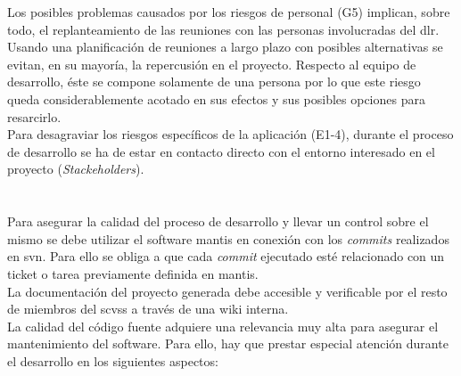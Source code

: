 Los posibles problemas causados por los riesgos de personal (G5) implican, sobre todo, el replanteamiento de las reuniones con las personas involucradas del \gls{dlr}. Usando una planificación de reuniones a largo plazo con posibles alternativas se evitan, en su mayoría, la repercusión en el proyecto. Respecto al equipo de desarrollo, éste se compone solamente de una persona por lo que este riesgo queda considerablemente acotado en sus efectos y sus posibles opciones para resarcirlo.\\

Para desagraviar los riesgos específicos de la aplicación (E1-4), durante el proceso de desarrollo se ha de estar en contacto directo con el entorno interesado en el proyecto (\textit{Stackeholders}).

\section{}

\begin{comment}
En esta sección se incluirán las actividades y tareas relacionadas con el aseguramiento de calidad a realizar durante el desarrollo del software. Se incluirán los estándares, prácticas y normas aplicables durante el desarrollo del software.\\

También, deberán recogerse los diferentes tipos de revisiones, verificaciones y validaciones que se van a llevar a cabo, los criterios para la aceptación o rechazo de cada producto y los procedimientos para implementar acciones correctoras o preventivas.
\end{comment}
Para asegurar la calidad del proceso de desarrollo y llevar un control sobre el mismo se debe utilizar el \gls{software} \gls{mantis} en conexión con los \textit{commits} realizados en \gls{svn}. Para ello se obliga a que cada \textit{commit} ejecutado esté relacionado con un ticket o tarea previamente definida en \gls{mantis}.\\

La documentación del proyecto generada debe accesible y verificable por el resto de miembros del \gls{scvss} a través de una \gls{wiki} interna.\\

La calidad del código fuente adquiere una relevancia muy alta para asegurar el mantenimiento del \gls{software}. Para ello, hay que prestar especial atención durante el desarrollo en los siguientes aspectos:

